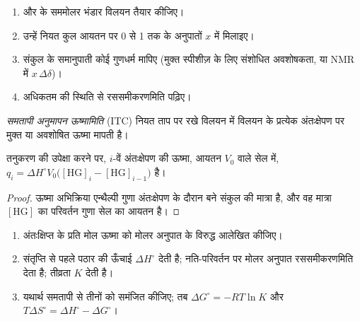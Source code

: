 \begin{method}[जॉब आलेख बनाना]\label{met:b3:supramolecular:job}
\begin{enumerate}
  \item {} और  के सममोलर भंडार विलयन तैयार कीजिए।
  \item उन्हें नियत कुल आयतन पर 0 से 1 तक के अनुपातों $x$ में मिलाइए।
  \item संकुल के समानुपाती कोई गुणधर्म मापिए (मुक्त स्पीशीज़ के लिए संशोधित
        अवशोषकता, या NMR में $x\,\Delta\delta$)।
  \item अधिकतम की स्थिति से रससमीकरणमिति पढ़िए।
\end{enumerate}
\end{method}

\begin{definition}[समतापी अनुमापन ऊष्मामिति]\label{def:b3:supramolecular:itc}
\emph{समतापी अनुमापन ऊष्मामिति}
(ITC) नियत ताप पर रखे  विलयन में  विलयन के प्रत्येक
अंतःक्षेपण पर मुक्त या अवशोषित ऊष्मा मापती है।
\end{definition}

\begin{proposition}[प्रति अंतःक्षेपण ऊष्मा]\label{prop:b3:supramolecular:itc}
तनुकरण की उपेक्षा करने पर, $i$-वें अंतःक्षेपण की ऊष्मा, आयतन $V_0$ वाले सेल में,
$q_i = \Delta H^\circ V_0\bigl([\mathrm{HG}]_i - [\mathrm{HG}]_{i-1}\bigr)$ है।
\end{proposition}

\begin{proof}
ऊष्मा अभिक्रिया एन्थैल्पी गुणा अंतःक्षेपण के दौरान बने संकुल की मात्रा है,
और वह मात्रा $[\mathrm{HG}]$ का परिवर्तन गुणा सेल का आयतन है।
\end{proof}

\begin{method}\label{met:b3:supramolecular:itc}
\begin{enumerate}
  \item अंतःक्षिप्त  के प्रति मोल ऊष्मा को मोलर अनुपात के विरुद्ध आलेखित कीजिए।
  \item संतृप्ति से पहले पठार की ऊँचाई $\Delta H^\circ$ देती है;
        नति-परिवर्तन पर मोलर अनुपात रससमीकरणमिति देता है; तीव्रता $K$ देती है।
  \item यथार्थ समतापी से तीनों को समंजित कीजिए; तब $\Delta G^\circ = -RT\ln K$ और
        $T\Delta S^\circ = \Delta H^\circ - \Delta G^\circ$।
\end{enumerate}
\end{method}

